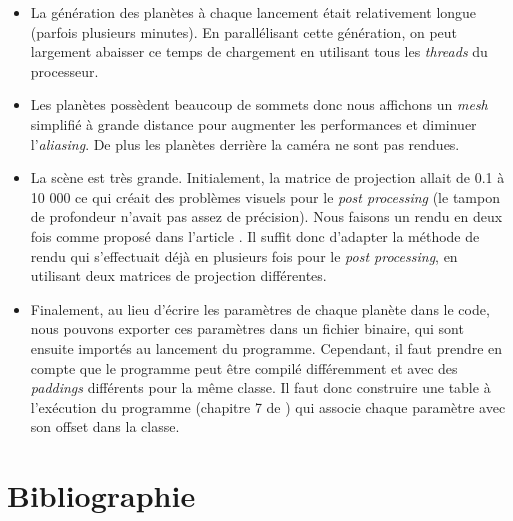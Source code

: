 \documentclass[a4paper,12pt,twoside]{article}
\begin{document}
\begin{itemize}
\item La génération des planètes à chaque lancement était relativement longue (parfois plusieurs minutes). En parallélisant cette génération, on peut largement abaisser ce temps de chargement en utilisant tous les \textit{threads} du processeur.

\item Les planètes possèdent beaucoup de sommets donc nous affichons un \textit{mesh} simplifié à grande distance pour augmenter les performances et diminuer l'\textit{aliasing}. De plus les planètes derrière la caméra ne sont pas rendues.

\item La scène est très grande. Initialement, la matrice de projection allait de 0.1 à 10 000 ce qui créait des problèmes visuels pour le \textit{post processing} (le tampon de profondeur n'avait pas assez de précision). Nous faisons un rendu en deux fois comme proposé dans l'article \cite{depthbufferprecision}. Il suffit donc d'adapter la méthode de rendu qui s'effectuait déjà en plusieurs fois pour le \textit{post processing}, en utilisant deux matrices de projection différentes.

\item Finalement, au lieu d'écrire les paramètres de chaque planète dans le code, nous pouvons exporter ces paramètres dans un fichier binaire, qui sont ensuite importés au lancement du programme. Cependant, il faut prendre en compte que le programme peut être compilé différemment et avec des \textit{paddings} différents pour la même classe. Il faut donc construire une table à l'exécution du programme (chapitre 7 de \cite{gameengine}) qui associe chaque paramètre avec son offset dans la classe.

\end{itemize}

\newpage

\section{Bibliographie}

\printbibliography
\end{document}
